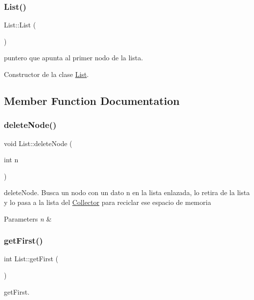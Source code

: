 \subsubsection{\texorpdfstring{List()}{List()}}
{\footnotesize\ttfamily List\+::\+List (\begin{DoxyParamCaption}{ }\end{DoxyParamCaption})}

puntero que apunta al primer nodo de la lista.

Constructor de la clase \hyperlink{classList}{List}. 

\subsection{Member Function Documentation}
\mbox{\label{classList_a6531aac590fce9b8e5040bcb633c89b1}} 
\subsubsection{\texorpdfstring{delete\+Node()}{deleteNode()}}
{\footnotesize\ttfamily void List\+::delete\+Node (\begin{DoxyParamCaption}\item[{int}]{n }\end{DoxyParamCaption})}

delete\+Node. Busca un nodo con un dato n en la lista enlazada, lo retira de la lista y lo pasa a la lista del \hyperlink{classCollector}{Collector} para reciclar ese espacio de memoria


\begin{DoxyParams}{Parameters}
{\em n} & \\
\hline
\end{DoxyParams}
\mbox{\label{classList_a0856adc8bce70d697a8c650b505d6080}} 
\subsubsection{\texorpdfstring{get\+First()}{getFirst()}}
{\footnotesize\ttfamily int List\+::get\+First (\begin{DoxyParamCaption}{ }\end{DoxyParamCaption})}

get\+First.

